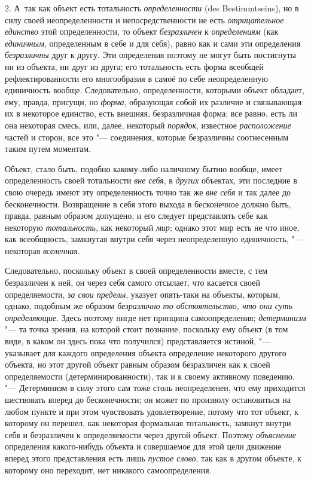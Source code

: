 {{2. А~так как объект есть тотальность {\em определенности} (des
Bestimmtseins), но в силу своей неопределенности и
непосредственности не есть {\em отрицательное единство}
этой определенности, то объект {\em безразличен} к
{\em определениям} (как {\em единичным},
определенным в себе и для себя), равно как и сами эти
определения {\em безразличны}
друг к другу. Эти определения поэтому не могут быть
постигнуты ни из объекта, ни друг из друга; его тотальность есть форма
всеобщей рефлектированности его многообразия в самоё по себе неопределенную
единичность вообще. Следовательно, определенности, которыми объект
обладает, ему, правда, присущи, но {\em форма}, образующая
собой их различие и связывающая их в некоторое единство, есть внешняя,
безразличная форма; все равно, есть ли она некоторая смесь, или, далее,
некоторый {\em порядок}, известное
{\em расположение} частей
и сторон, все это "--- соединения, которые безразличны
соотнесенным таким путем моментам.

Объект, стало быть, подобно какому-либо наличному бытию
вообще, имеет определенность своей тотальности
{\em вне себя}, в {\em других} объектах,
эти последние в свою очередь имеют эту определенность точно так же
{\em вне себя} и так
далее до бесконечности. Возвращение в себя этого выхода в бесконечное
должно быть, правда, равным образом допущено, и его следует представлять
себе как некоторую {\em тотальность},
как некоторый {\em мир};
однако этот мир есть не что иное, как всеобщность, замкнутая
внутри себя через неопределенную единичность, "--- некоторая {\em вселенная}.

Следовательно, поскольку объект в своей определенности вместе,
с тем безразличен к ней, он через себя самого отсылает, что касается своей
определяемости, {\em за свои пределы},
указует опять-таки на объекты, которым, однако, подобным же
образом {\em безразлично то
обстоятельство, что они суть определяющие}. Здесь поэтому
нигде нет принципа самоопределения;
{\em детерминизм} "--- та
точка зрения, на которой стоит познание, поскольку ему объект (в том виде,
в каком он здесь пока что получился) представляется истиной, "---
указывает для каждого определения объекта определение
некоторого другого объекта, но этот другой объект равным образом
безразличен как к своей определяемости (детерминированности), так и к
своему активному поведению. "--- Детерминизм в силу этого сам
тоже столь неопределенен, что ему приходится шествовать вперед до
бесконечности; он может по произволу остановиться на любом пункте и при
этом чувствовать удовлетворение, потому что тот объект, к которому он
перешел, как некоторая формальная тотальность, замкнут внутри себя и
безразличен к определяемости через другой объект. Поэтому {\em объяснение}
определения какого-нибудь объекта и совершаемое для этой цели
движение вперед этого представления есть лишь {\em пустое слово}, так
как в другом объекте, к которому оно переходит, нет никакого самоопределения.

}}
